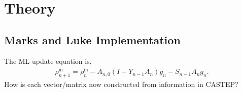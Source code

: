 
\chapter{Theory} %

\label{Chapter1} %


\section{Marks and Luke Implementation}

The ML update equation is,
\begin{align}
\rho^{\text{in}}_{n+1} = \rho^{\text{in}}_{n} - A_{n,0} ( I - Y_{n-1} A_n ) g_n - S_{n-1} A_n g_n.
\end{align}
How is each vector/matrix now constructed from information in CASTEP?

